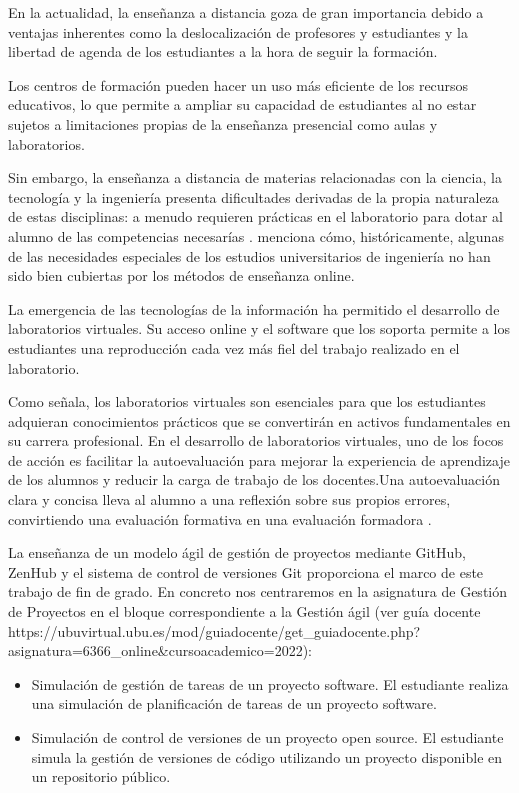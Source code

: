 
En la actualidad, la enseñanza a distancia goza de gran importancia debido a ventajas inherentes como la deslocalización de profesores y estudiantes y la  libertad de agenda de los estudiantes a la hora de seguir la formación.

Los centros de formación pueden  hacer un  uso más eficiente de los recursos educativos, lo que permite a ampliar su capacidad de estudiantes al no estar sujetos a limitaciones propias de la enseñanza presencial como aulas y laboratorios.

Sin embargo, la enseñanza a distancia de materias relacionadas con la ciencia, la tecnología y  la ingeniería  presenta dificultades derivadas de la propia naturaleza de estas disciplinas: a menudo requieren prácticas en el laboratorio para dotar al alumno de las competencias necesarías . \cite{bourne2019} menciona  cómo, históricamente, algunas de las necesidades especiales de los estudios universitarios de ingeniería no han sido bien cubiertas por los métodos de enseñanza online.

La emergencia de las tecnologías de la información ha permitido el desarrollo de laboratorios virtuales. Su acceso online y el software que los soporta permite a los estudiantes una reproducción cada vez más fiel del trabajo realizado en el laboratorio.

Como \cite{tejado2018}  señala, los laboratorios virtuales son esenciales para que los estudiantes adquieran conocimientos prácticos que se convertirán en  activos fundamentales en su  carrera profesional. En el desarrollo de laboratorios virtuales, uno de los focos de acción es facilitar la autoevaluación para mejorar la experiencia de aprendizaje de los alumnos y reducir la carga de trabajo de los docentes.Una autoevaluación clara y concisa lleva al alumno a una reflexión sobre sus propios errores, convirtiendo una evaluación formativa en una evaluación formadora \cite{sánchez2009}.

La enseñanza de un modelo ágil de gestión de proyectos mediante GitHub, ZenHub  y el sistema de control de versiones Git proporciona el marco de este trabajo de fin de grado. En concreto nos centraremos en la asignatura de Gestión de Proyectos en el bloque correspondiente a la Gestión ágil (ver guía docente https://ubuvirtual.ubu.es/mod/guiadocente/get_guiadocente.php?asignatura=6366_online&cursoacademico=2022):

\begin{itemize}
	\item Simulación de gestión de tareas de un proyecto software. El estudiante realiza una simulación de planificación de tareas de un proyecto software.
	\item Simulación de control de versiones de un proyecto open source. El estudiante simula la gestión de versiones de código utilizando un proyecto disponible en un repositorio público.
\end{itemize}

